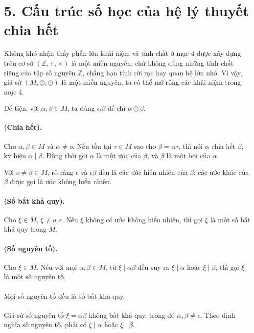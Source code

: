 \documentclass[11pt]{article}
\begin{document}
\section*{5. Cấu trúc số học của hệ lý thuyết chia hết}

Không khó nhận thấy phần lớn khái niệm và tính chất ở mục 4 được xây dựng
trên cơ sở \((\mathbb Z,+,\times)\) là một miền nguyên, chứ không dùng những
tính chất riêng của tập số nguyên \(\mathbb Z\), chẳng hạn tính rời rạc hay
quan hệ lớn nhỏ. Vì vậy, giả sử \((M,\oplus,\odot)\) là một miền nguyên, ta
có thể mở rộng các khái niệm trong mục 4.

Để tiện, với \(\alpha,\beta\in M\), ta dùng \(\alpha\beta\) để chỉ
\(\alpha\odot\beta\).

\paragraph{ (Chia hết).}
Cho \(\alpha,\beta\in M\) và \(\alpha\ne o\). Nếu tồn tại \(\tau\in M\) sao
cho \(\beta=\alpha\tau\), thì nói \(\alpha\) chia hết \(\beta\), ký hiệu
\(\alpha\mid\beta\). Đồng thời gọi \(\alpha\) là một ước của \(\beta\), và
\(\beta\) là một bội của \(\alpha\).

Với \(o\ne\beta\in M\), rõ ràng \(\epsilon\) và \(\epsilon\beta\) đều là các
ước hiển nhiên của \(\beta\); các ước khác của \(\beta\) được gọi là ước
không hiển nhiên.

\paragraph{ (Số bất khả quy).}
Cho \(\xi\in M\), \(\xi\ne o,\epsilon\). Nếu \(\xi\) không có ước không hiển
nhiên, thì gọi \(\xi\) là một số bất khả quy trong \(M\).

\paragraph{ (Số nguyên tố).}
Cho \(\xi\in M\). Nếu với mọi \(\alpha,\beta\in M\), từ \(\xi\mid
\alpha\beta\) đều suy ra \(\xi\mid\alpha\) hoặc \(\xi\mid\beta\), thì gọi
\(\xi\) là một số nguyên tố.

\paragraph{}
Mọi số nguyên tố đều là số bất khả quy.

\paragraph{}
Giả sử số nguyên tố \(\xi=\alpha\beta\) không bất khả quy, trong đó
\(\alpha,\beta\ne\epsilon\). Theo định nghĩa số nguyên tố, phải có
\(\xi\mid\alpha\) hoặc \(\xi\mid\beta\).
\end{document}
